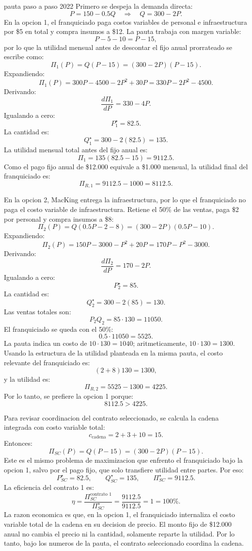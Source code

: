 \begin{pautacompleta}{pauta paso a paso 2022}
Primero se despeja la demanda directa:
\[
  P=150-0.5Q
  \quad\Rightarrow\quad
  Q=300-2P.
\]
En la opcion 1, el franquiciado paga costos variables de personal e infraestructura por \$5 en total y compra insumos a \$12. La pauta trabaja con margen variable:
\[
  P-5-10=P-15,
\]
por lo que la utilidad mensual antes de descontar el fijo anual prorrateado se escribe como:
\[
  \Pi_1(P)=Q(P-15)=(300-2P)(P-15).
\]
Expandiendo:
\[
  \Pi_1(P)=300P-4500-2P^2+30P
  =330P-2P^2-4500.
\]
Derivando:
\[
  \frac{d\Pi_1}{dP}=330-4P.
\]
Igualando a cero:
\[
  P_1^\star=82.5.
\]
La cantidad es:
\[
  Q_1^\star=300-2(82.5)=135.
\]
La utilidad mensual total antes del fijo anual es:
\[
  \Pi_1=135(82.5-15)=9112.5.
\]
Como el pago fijo anual de \$12.000 equivale a \$1.000 mensual, la utilidad final del franquiciado es:
\[
  \Pi_{R,1}=9112.5-1000=8112.5.
\]

En la opcion 2, MacKing entrega la infraestructura, por lo que el franquiciado no paga el costo variable de infraestructura. Retiene el 50\% de las ventas, paga \$2 por personal y compra insumos a \$8:
\[
  \Pi_2(P)=Q(0.5P-2-8)=(300-2P)(0.5P-10).
\]
Expandiendo:
\[
  \Pi_2(P)=150P-3000-P^2+20P
  =170P-P^2-3000.
\]
Derivando:
\[
  \frac{d\Pi_2}{dP}=170-2P.
\]
Igualando a cero:
\[
  P_2^\star=85.
\]
La cantidad es:
\[
  Q_2^\star=300-2(85)=130.
\]
Las ventas totales son:
\[
  P_2Q_2=85\cdot 130=11050.
\]
El franquiciado se queda con el 50\%:
\[
  0.5\cdot 11050=5525.
\]
La pauta indica un costo de $10\cdot 130=1040$; aritmeticamente, $10\cdot 130=1300$. Usando la estructura de la utilidad planteada en la misma pauta, el costo relevante del franquiciado es:
\[
  (2+8)130=1300,
\]
y la utilidad es:
\[
  \Pi_{R,2}=5525-1300=4225.
\]
Por lo tanto, se prefiere la opcion 1 porque:
\[
  8112.5>4225.
\]

Para revisar coordinacion del contrato seleccionado, se calcula la cadena integrada con costo variable total:
\[
  c_{\text{cadena}}=2+3+10=15.
\]
Entonces:
\[
  \Pi_{SC}(P)=Q(P-15)=(300-2P)(P-15).
\]
Este es el mismo problema de maximizacion que enfrento el franquiciado bajo la opcion 1, salvo por el pago fijo, que solo transfiere utilidad entre partes. Por eso:
\[
  P_{SC}^\star=82.5,
  \qquad
  Q_{SC}^\star=135,
  \qquad
  \Pi_{SC}^\star=9112.5.
\]
La eficiencia del contrato 1 es:
\[
  \eta=\frac{\Pi_{SC}^{\text{contrato 1}}}{\Pi_{SC}^\star}
  =\frac{9112.5}{9112.5}=1=100\%.
\]
La razon economica es que, en la opcion 1, el franquiciado internaliza el costo variable total de la cadena en su decision de precio. El monto fijo de \$12.000 anual no cambia el precio ni la cantidad, solamente reparte la utilidad. Por lo tanto, bajo los numeros de la pauta, el contrato seleccionado coordina la cadena.
\end{pautacompleta}

